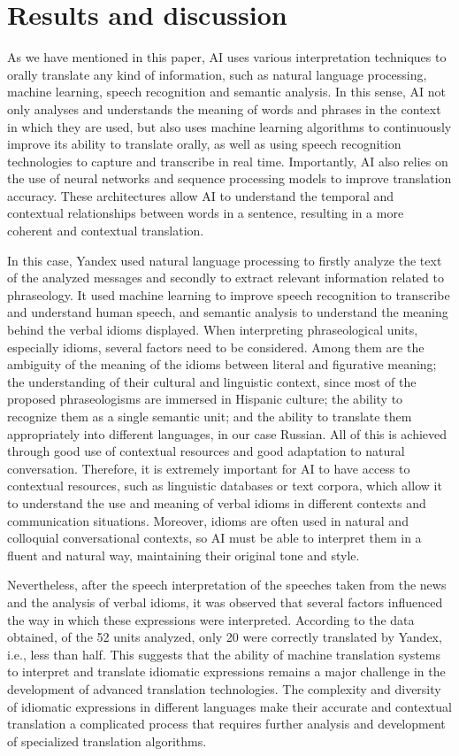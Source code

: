 \section{Results and discussion}\label{sec-results}

As we have mentioned in this paper, AI uses various interpretation
techniques to orally translate any kind of information, such as natural
language processing, machine learning, speech recognition and semantic
analysis. In this sense, AI not only analyses and understands the
meaning of words and phrases in the context in which they are used, but
also uses machine learning algorithms to continuously improve its
ability to translate orally, as well as using speech recognition
technologies to capture and transcribe in real time. Importantly, AI
also relies on the use of neural networks and sequence processing models
to improve translation accuracy. These architectures allow AI to
understand the temporal and contextual relationships between words in a
sentence, resulting in a more coherent and contextual translation.

In this case, Yandex used natural language processing to firstly analyze
the text of the analyzed messages and secondly to extract relevant
information related to phraseology. It used machine learning to improve
speech recognition to transcribe and understand human speech, and
semantic analysis to understand the meaning behind the verbal idioms
displayed. When interpreting phraseological units, especially idioms,
several factors need to be considered. Among them are the ambiguity of
the meaning of the idioms between literal and figurative meaning; the
understanding of their cultural and linguistic context, since most of
the proposed phraseologisms are immersed in Hispanic culture; the
ability to recognize them as a single semantic unit; and the ability to
translate them appropriately into different languages, in our case
Russian. All of this is achieved through good use of contextual
resources and good adaptation to natural conversation. Therefore, it is
extremely important for AI to have access to contextual resources, such
as linguistic databases or text corpora, which allow it to understand
the use and meaning of verbal idioms in different contexts and
communication situations. Moreover, idioms are often used in natural and
colloquial conversational contexts, so AI must be able to interpret them
in a fluent and natural way, maintaining their original tone and style.

Nevertheless, after the speech interpretation of the speeches taken from
the news and the analysis of verbal idioms, it was observed that several
factors influenced the way in which these expressions were interpreted.
According to the data obtained, of the 52 units analyzed, only 20 were
correctly translated by Yandex, i.e., less than half. This suggests that
the ability of machine translation systems to interpret and translate
idiomatic expressions remains a major challenge in the development of
advanced translation technologies. The complexity and diversity of
idiomatic expressions in different languages make their accurate and
contextual translation a complicated process that requires further
analysis and development of specialized translation algorithms.

